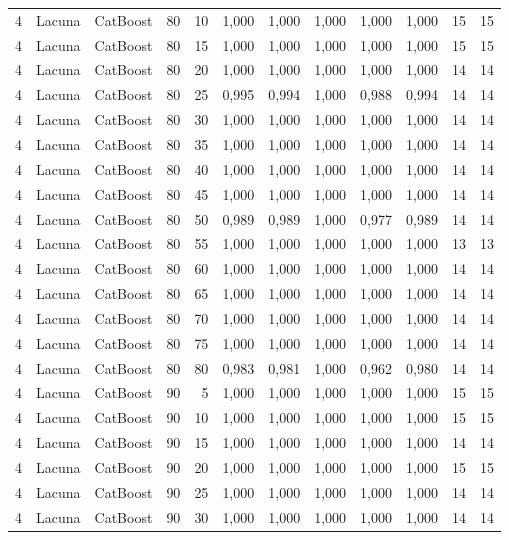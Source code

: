 \begin{longtable}{ccclrrrrrrrr}
4 & Lacuna & CatBoost & 80 & 10 & 1,000 & 1,000 & 1,000 & 1,000 & 1,000 & 15 & 15 \\
4 & Lacuna & CatBoost & 80 & 15 & 1,000 & 1,000 & 1,000 & 1,000 & 1,000 & 15 & 15 \\
4 & Lacuna & CatBoost & 80 & 20 & 1,000 & 1,000 & 1,000 & 1,000 & 1,000 & 14 & 14 \\
4 & Lacuna & CatBoost & 80 & 25 & 0,995 & 0,994 & 1,000 & 0,988 & 0,994 & 14 & 14 \\
4 & Lacuna & CatBoost & 80 & 30 & 1,000 & 1,000 & 1,000 & 1,000 & 1,000 & 14 & 14 \\
4 & Lacuna & CatBoost & 80 & 35 & 1,000 & 1,000 & 1,000 & 1,000 & 1,000 & 14 & 14 \\
4 & Lacuna & CatBoost & 80 & 40 & 1,000 & 1,000 & 1,000 & 1,000 & 1,000 & 14 & 14 \\
4 & Lacuna & CatBoost & 80 & 45 & 1,000 & 1,000 & 1,000 & 1,000 & 1,000 & 14 & 14 \\
4 & Lacuna & CatBoost & 80 & 50 & 0,989 & 0,989 & 1,000 & 0,977 & 0,989 & 14 & 14 \\
4 & Lacuna & CatBoost & 80 & 55 & 1,000 & 1,000 & 1,000 & 1,000 & 1,000 & 13 & 13 \\
4 & Lacuna & CatBoost & 80 & 60 & 1,000 & 1,000 & 1,000 & 1,000 & 1,000 & 14 & 14 \\
4 & Lacuna & CatBoost & 80 & 65 & 1,000 & 1,000 & 1,000 & 1,000 & 1,000 & 14 & 14 \\
4 & Lacuna & CatBoost & 80 & 70 & 1,000 & 1,000 & 1,000 & 1,000 & 1,000 & 14 & 14 \\
4 & Lacuna & CatBoost & 80 & 75 & 1,000 & 1,000 & 1,000 & 1,000 & 1,000 & 14 & 14 \\
4 & Lacuna & CatBoost & 80 & 80 & 0,983 & 0,981 & 1,000 & 0,962 & 0,980 & 14 & 14 \\
4 & Lacuna & CatBoost & 90 & 5 & 1,000 & 1,000 & 1,000 & 1,000 & 1,000 & 15 & 15 \\
4 & Lacuna & CatBoost & 90 & 10 & 1,000 & 1,000 & 1,000 & 1,000 & 1,000 & 15 & 15 \\
4 & Lacuna & CatBoost & 90 & 15 & 1,000 & 1,000 & 1,000 & 1,000 & 1,000 & 14 & 14 \\
4 & Lacuna & CatBoost & 90 & 20 & 1,000 & 1,000 & 1,000 & 1,000 & 1,000 & 15 & 15 \\
4 & Lacuna & CatBoost & 90 & 25 & 1,000 & 1,000 & 1,000 & 1,000 & 1,000 & 14 & 14 \\
4 & Lacuna & CatBoost & 90 & 30 & 1,000 & 1,000 & 1,000 & 1,000 & 1,000 & 14 & 14 \\

\end{longtable}
